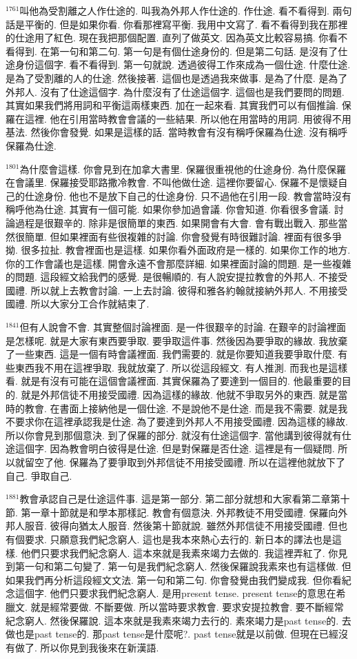 \documentclass{book}
\begin{document}
$^{1761}$叫他為受割離之人作仕途的.
叫我為外邦人作仕途的.
作仕途.
看不看得到.
兩句話是平衡的.
但是如果你看.
你看那裡寫平衡.
我用中文寫了.
看不看得到我在那裡的仕途用了紅色.
現在我把那個配置.
直列了做英文.
因為英文比較容易搞.
你看不看得到.
在第一句和第二句.
第一句是有個仕途身份的.
但是第二句話.
是沒有了仕途身份這個字.
看不看得到.
第一句就說.
透過彼得工作來成為一個仕途.
什麼仕途.
是為了受割離的人的仕途.
然後接著.
這個也是透過我來做事.
是為了什麼.
是為了外邦人.
沒有了仕途這個字.
為什麼沒有了仕途這個字.
這個也是我們要問的問題.
其實如果我們將用詞和平衡這兩樣東西.
加在一起來看.
其實我們可以有個推論.
保羅在這裡.
他在引用當時教會會議的一些結果.
所以他在用當時的用詞.
用彼得不用基法.
然後你會發覺.
如果是這樣的話.
當時教會有沒有稱呼保羅為仕途.
沒有稱呼保羅為仕途.

$^{1801}$為什麼會這樣.
你會見到在加拿大書里.
保羅很重視他的仕途身份.
為什麼保羅在會議里.
保羅接受耶路撒冷教會.
不叫他做仕途.
這裡你要留心.
保羅不是懷疑自己的仕途身份.
他也不是放下自己的仕途身份.
只不過他在引用一段.
教會當時沒有稱呼他為仕途.
其實有一個可能.
如果你參加過會議.
你會知道.
你看很多會議.
討論過程是很艱辛的.
除非是很簡單的東西.
如果開會有大會.
會有戰出戰入.
那些當然很簡單.
但如果裡面有些很複雜的討論.
你會發覺有時很難討論.
裡面有很多爭拗.
很多拉扯.
教會裡面也是這樣.
如果你看外面政府是一樣的.
如果你工作的地方.
你的工作會議也是這樣.
開會永遠不會那麼詳細.
如果裡面討論的問題.
是一些複雜的問題.
這段經文給我們的感覺.
是很暢順的.
有人說安提拉教會的外邦人.
不接受國禮.
所以就上去教會討論.
一上去討論.
彼得和雅各約翰就接納外邦人.
不用接受國禮.
所以大家分工合作就結束了.

$^{1841}$但有人說會不會.
其實整個討論裡面.
是一件很艱辛的討論.
在艱辛的討論裡面是怎樣呢.
就是大家有東西要爭取.
要爭取這件事.
然後因為要爭取的緣故.
我放棄了一些東西.
這是一個有時會議裡面.
我們需要的.
就是你要知道我要爭取什麼.
有些東西我不用在這裡爭取.
我就放棄了.
所以從這段經文.
有人推測.
而我也是這樣看.
就是有沒有可能在這個會議裡面.
其實保羅為了要達到一個目的.
他最重要的目的.
就是外邦信徒不用接受國禮.
因為這樣的緣故.
他就不爭取另外的東西.
就是當時的教會.
在書面上接納他是一個仕途.
不是說他不是仕途.
而是我不需要.
就是我不要求你在這裡承認我是仕途.
為了要達到外邦人不用接受國禮.
因為這樣的緣故.
所以你會見到那個意決.
到了保羅的部分.
就沒有仕途這個字.
當他講到彼得就有仕途這個字.
因為教會明白彼得是仕途.
但是對保羅是否仕途.
這裡是有一個疑問.
所以就留空了他.
保羅為了要爭取到外邦信徒不用接受國禮.
所以在這裡他就放下了自己.
爭取自己.

$^{1881}$教會承認自己是仕途這件事.
這是第一部分.
第二部分就想和大家看第二章第十節.
第一章十節就是和學本那樣記.
教會有個意決.
外邦教徒不用受國禮.
保羅向外邦人服音.
彼得向猶太人服音.
然後第十節就說.
雖然外邦信徒不用接受國禮.
但也有個要求.
只願意我們紀念窮人.
這也是我本來熱心去行的.
新日本的譯法也是這樣.
他們只要求我們紀念窮人.
這本來就是我素來竭力去做的.
我這裡弄紅了.
你見到第一句和第二句變了.
第一句是我們紀念窮人.
然後保羅說我素來也有這樣做.
但如果我們再分析這段經文文法.
第一句和第二句.
你會發覺由我們變成我.
但你看紀念這個字.
他們只要求我們紀念窮人.
是用present tense.
present tense的意思在希臘文.
就是經常要做.
不斷要做.
所以當時要求教會.
要求安提拉教會.
要不斷經常紀念窮人.
然後保羅說.
這本來就是我素來竭力去行的.
素來竭力是past tense的.
去做也是past tense的.
那past tense是什麼呢?.
past tense就是以前做.
但現在已經沒有做了.
所以你見到我後來在新漢語.
\end{document}
